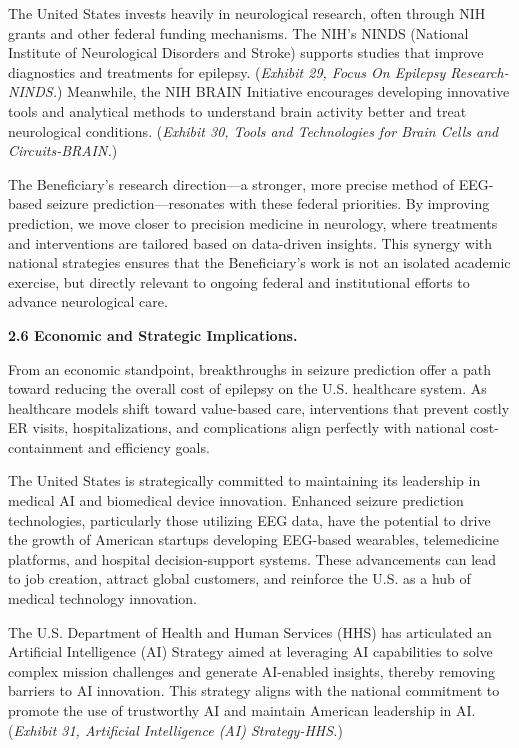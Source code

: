 \documentclass{article}
\begin{document}
The United States invests heavily in neurological research, often through NIH grants and other federal funding mechanisms. The NIH’s NINDS (National Institute of Neurological Disorders and Stroke) supports studies that improve diagnostics and treatments for epilepsy. ({\it Exhibit 29, Focus On Epilepsy Research-NINDS.}) Meanwhile, the NIH BRAIN Initiative encourages developing innovative tools and analytical methods to understand brain activity better and treat neurological conditions. ({\it Exhibit 30, Tools and Technologies for Brain Cells and Circuits-BRAIN.})

The Beneficiary’s research direction—a stronger, more precise method of EEG-based seizure prediction—resonates with these federal priorities. By improving prediction, we move closer to precision medicine in neurology, where treatments and interventions are tailored based on data-driven insights. This synergy with national strategies ensures that the Beneficiary’s work is not an isolated academic exercise, but directly relevant to ongoing federal and institutional efforts to advance neurological care.


{\bf 2.6 Economic and Strategic Implications. }

From an economic standpoint, breakthroughs in seizure prediction offer a path toward reducing the overall cost of epilepsy on the U.S. healthcare system. As healthcare models shift toward value-based care, interventions that prevent costly ER visits, hospitalizations, and complications align perfectly with national cost-containment and efficiency goals.

The United States is strategically committed to maintaining its leadership in medical AI and biomedical device innovation. Enhanced seizure prediction technologies, particularly those utilizing EEG data, have the potential to drive the growth of American startups developing EEG-based wearables, telemedicine platforms, and hospital decision-support systems. These advancements can lead to job creation, attract global customers, and reinforce the U.S. as a hub of medical technology innovation.

The U.S. Department of Health and Human Services (HHS) has articulated an Artificial Intelligence (AI) Strategy aimed at leveraging AI capabilities to solve complex mission challenges and generate AI-enabled insights, thereby removing barriers to AI innovation. This strategy aligns with the national commitment to promote the use of trustworthy AI and maintain American leadership in AI.  ({\it Exhibit 31, Artificial Intelligence (AI) Strategy-HHS.})
\end{document}
